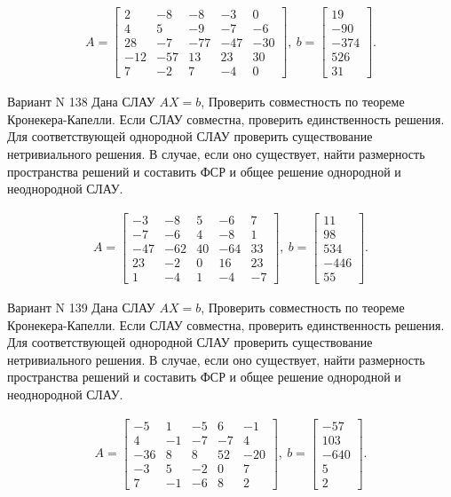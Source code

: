 \documentclass[11pt]{report}
\begin{document}
\begin{align*}
 A = \left[\begin{matrix}2 & -8 & -8 & -3 & 0\\4 & 5 & -9 & -7 & -6\\28 & -7 & -77 & -47 & -30\\-12 & -57 & 13 & 23 & 30\\7 & -2 & 7 & -4 & 0\end{matrix}\right],
\ b = \left[\begin{matrix}19\\-90\\-374\\526\\31\end{matrix}\right]. 
 \end{align*}

Вариант N 138
Дана СЛАУ $AX = b$,
Проверить совместность по теореме Кронекера-Капелли. Если СЛАУ совместна, проверить единственность решения.
Для соответствующей однородной СЛАУ проверить существование нетривиального решения. В случае, если оно существует,
найти размерность пространства решений и составить ФСР и общее решение однородной  и неоднородной СЛАУ.


\begin{align*}
 A = \left[\begin{matrix}-3 & -8 & 5 & -6 & 7\\-7 & -6 & 4 & -8 & 1\\-47 & -62 & 40 & -64 & 33\\23 & -2 & 0 & 16 & 23\\1 & -4 & 1 & -4 & -7\end{matrix}\right],
\ b = \left[\begin{matrix}11\\98\\534\\-446\\55\end{matrix}\right]. 
 \end{align*}

Вариант N 139
Дана СЛАУ $AX = b$,
Проверить совместность по теореме Кронекера-Капелли. Если СЛАУ совместна, проверить единственность решения.
Для соответствующей однородной СЛАУ проверить существование нетривиального решения. В случае, если оно существует,
найти размерность пространства решений и составить ФСР и общее решение однородной  и неоднородной СЛАУ.


\begin{align*}
 A = \left[\begin{matrix}-5 & 1 & -5 & 6 & -1\\4 & -1 & -7 & -7 & 4\\-36 & 8 & 8 & 52 & -20\\-3 & 5 & -2 & 0 & 7\\7 & -1 & -6 & 8 & 2\end{matrix}\right],
\ b = \left[\begin{matrix}-57\\103\\-640\\5\\2\end{matrix}\right]. 
 \end{align*}
\end{document}

